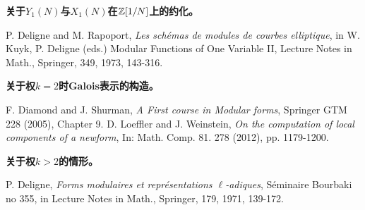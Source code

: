 \textbf{关于$Y_1(N)$与$X_1(N)$在$\mathbb{Z}[1/N]$上的约化。}
\begin{references}
 P. Deligne and M. Rapoport, \emph{Les schémas de modules de courbes elliptique}, in W. Kuyk, P. Deligne (eds.) Modular Functions of One Variable II, Lecture Notes in Math., Springer, 349, 1973, 143-316.
\end{references}
\textbf{关于权$k=2$时Galois表示的构造。}
\begin{references}
 F. Diamond and J. Shurman, \emph{A First course in Modular forms}, Springer GTM 228 (2005), Chapter 9.
 D. Loeffler and J. Weinstein, \emph{On the computation of local components of a newform}, In: Math. Comp. 81. 278 (2012), pp. 1179-1200.
\end{references}
\textbf{关于权$k>2$的情形。}
\begin{references}
 P. Deligne, \emph{Forms modulaires et représentations $\ell$-adiques}, Séminaire Bourbaki no 355, in Lecture Notes in Math., Springer, 179, 1971, 139-172.
\end{references}
